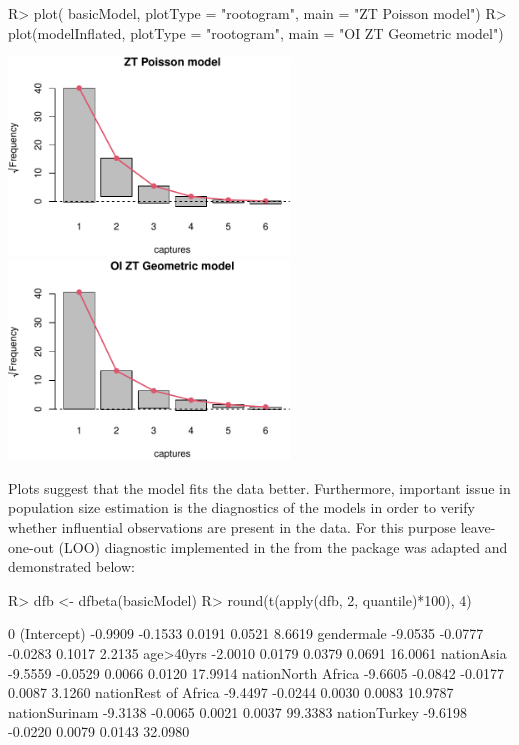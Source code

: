 \documentclass[
]{jss}
\newcommand{\1}{\mathcal{I}} \newcommand{\bZero}{\boldsymbol{0}}
\begin{document}
\begin{CodeChunk}
\begin{CodeInput}
R> plot(   basicModel, plotType = "rootogram", main = "ZT Poisson model")
R> plot(modelInflated, plotType = "rootogram", main = "OI ZT Geometric model")
\end{CodeInput}


\begin{center}\includegraphics[width=7.5cm]{singleRcapture_files/figure-latex/rootogram-1} \includegraphics[width=7.5cm]{singleRcapture_files/figure-latex/rootogram-2} \end{center}

\end{CodeChunk}

Plots suggest that the  model fits the data better.
Furthermore, important issue in population size estimation is the
diagnostics of the models in order to verify whether influential
observations are present in the data. For this purpose leave-one-out
(LOO) diagnostic implemented in the  from the 
package was adapted and demonstrated below:

\begin{CodeChunk}
\begin{CodeInput}
R> dfb <- dfbeta(basicModel)
R> round(t(apply(dfb, 2, quantile)*100), 4)
\end{CodeInput}
\begin{CodeOutput}
                          0%
(Intercept)          -0.9909 -0.1533  0.0191 0.0521  8.6619
gendermale           -9.0535 -0.0777 -0.0283 0.1017  2.2135
age>40yrs            -2.0010  0.0179  0.0379 0.0691 16.0061
nationAsia           -9.5559 -0.0529  0.0066 0.0120 17.9914
nationNorth Africa   -9.6605 -0.0842 -0.0177 0.0087  3.1260
nationRest of Africa -9.4497 -0.0244  0.0030 0.0083 10.9787
nationSurinam        -9.3138 -0.0065  0.0021 0.0037 99.3383
nationTurkey         -9.6198 -0.0220  0.0079 0.0143 32.0980
\end{CodeOutput}
\end{CodeChunk}
\end{document}
